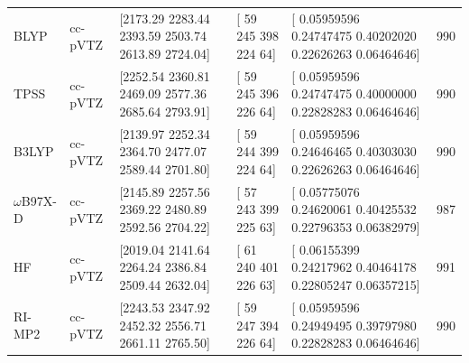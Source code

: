 \begin{table}[h]
\begin{longtable}[]{@{}llllll@{}}
    BLYP & cc-pVTZ & {[}2173.29 2283.44 2393.59 2503.74 2613.89 2724.04{]} & {[} 59 245 398 224 64{]} & {[} 0.05959596 0.24747475 0.40202020 0.22626263 0.06464646{]} & 990\tabularnewline
    TPSS & cc-pVTZ & {[}2252.54 2360.81 2469.09 2577.36 2685.64 2793.91{]} & {[} 59 245 396 226 64{]} & {[} 0.05959596 0.24747475 0.40000000 0.22828283 0.06464646{]} & 990\tabularnewline
    B3LYP & cc-pVTZ & {[}2139.97 2252.34 2364.70 2477.07 2589.44 2701.80{]} & {[} 59 244 399 224 64{]} & {[} 0.05959596 0.24646465 0.40303030 0.22626263 0.06464646{]} & 990\tabularnewline
    \(\omega\)B97X-D & cc-pVTZ & {[}2145.89 2257.56 2369.22 2480.89 2592.56 2704.22{]} & {[} 57 243 399 225 63{]} & {[} 0.05775076 0.24620061 0.40425532 0.22796353 0.06382979{]} & 987\tabularnewline
    HF & cc-pVTZ & {[}2019.04 2141.64 2264.24 2386.84 2509.44 2632.04{]} & {[} 61 240 401 226 63{]} & {[} 0.06155399 0.24217962 0.40464178 0.22805247 0.06357215{]} & 991\tabularnewline
    RI-MP2 & cc-pVTZ & {[}2243.53 2347.92 2452.32 2556.71 2661.11 2765.50{]} & {[} 59 247 394 226 64{]} & {[} 0.05959596 0.24949495 0.39797980 0.22828283 0.06464646{]} & 990\tabularnewline
    \bottomrule
  \end{longtable}
\end{table}

\section{}
\label{paper_02:sec:SIII}

